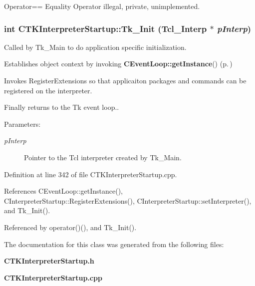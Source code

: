 Operator== Equality Operator illegal, private, unimplemented.

\subsubsection{\setlength{\rightskip}{0pt plus 5cm}int CTKInterpreter\-Startup::Tk\_\-Init (Tcl\_\-Interp $\ast$ {\em p\-Interp})\hspace{0.3cm}{\tt  [static, protected]}}\label{classCTKInterpreterStartup_e0}


Called by Tk\_\-Main to do application  specific initialization.

\begin{CompactItemize}
\item 
Establishes object context by invoking {\bf CEvent\-Loop::get\-Instance}() {\rm (p.\,\pageref{classCEventLoop_d0})} \item 
Invokes Register\-Extensions so that applicaiton packages and commands can be registered on the interpreter.\item 
Finally returns to the Tk event loop..\end{CompactItemize}
\begin{Desc}
\item[Parameters: ]\par
\begin{description}
\item[{\em 
p\-Interp}]Pointer to the Tcl interpreter created by Tk\_\-Main. \end{description}
\end{Desc}


Definition at line 342 of file CTKInterpreter\-Startup.cpp.

References CEvent\-Loop::get\-Instance(), CInterpreter\-Startup::Register\-Extensions(), CInterpreter\-Startup::set\-Interpreter(), and Tk\_\-Init().

Referenced by operator()(), and Tk\_\-Init().

The documentation for this class was generated from the following files:\begin{CompactItemize}
\item 
{\bf CTKInterpreter\-Startup.h}\item 
{\bf CTKInterpreter\-Startup.cpp}\end{CompactItemize}
